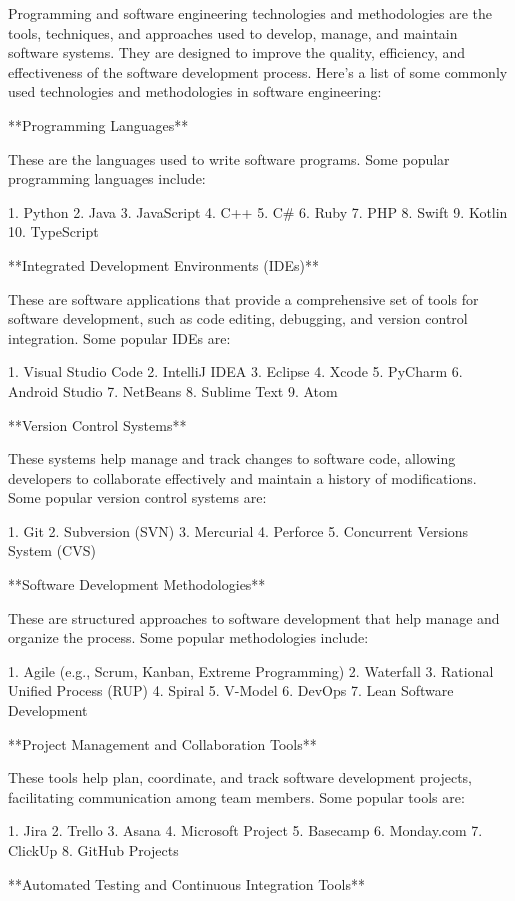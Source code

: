 \documentclass{article}
\begin{document}
Programming and software engineering technologies and methodologies are the tools, techniques, and approaches used to develop, manage, and maintain software systems. They are designed to improve the quality, efficiency, and effectiveness of the software development process. Here's a list of some commonly used technologies and methodologies in software engineering:

**Programming Languages**

These are the languages used to write software programs. Some popular programming languages include:

1. Python
2. Java
3. JavaScript
4. C++
5. C#
6. Ruby
7. PHP
8. Swift
9. Kotlin
10. TypeScript

**Integrated Development Environments (IDEs)**

These are software applications that provide a comprehensive set of tools for software development, such as code editing, debugging, and version control integration. Some popular IDEs are:

1. Visual Studio Code
2. IntelliJ IDEA
3. Eclipse
4. Xcode
5. PyCharm
6. Android Studio
7. NetBeans
8. Sublime Text
9. Atom

**Version Control Systems**

These systems help manage and track changes to software code, allowing developers to collaborate effectively and maintain a history of modifications. Some popular version control systems are:

1. Git
2. Subversion (SVN)
3. Mercurial
4. Perforce
5. Concurrent Versions System (CVS)

**Software Development Methodologies**

These are structured approaches to software development that help manage and organize the process. Some popular methodologies include:

1. Agile (e.g., Scrum, Kanban, Extreme Programming)
2. Waterfall
3. Rational Unified Process (RUP)
4. Spiral
5. V-Model
6. DevOps
7. Lean Software Development

**Project Management and Collaboration Tools**

These tools help plan, coordinate, and track software development projects, facilitating communication among team members. Some popular tools are:

1. Jira
2. Trello
3. Asana
4. Microsoft Project
5. Basecamp
6. Monday.com
7. ClickUp
8. GitHub Projects

**Automated Testing and Continuous Integration Tools**
\end{document}
